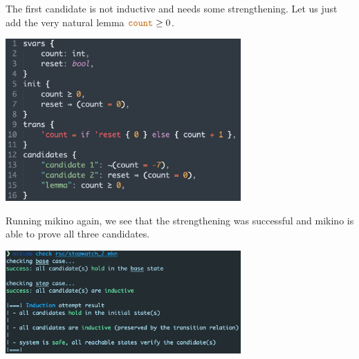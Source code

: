 \documentclass{easychair}
\newcommand{\mkn}{mikino}
\newcommand{\code}[1]{\textcolor{orange!75!black}{\texttt{#1}}}
\newcommand{\picwidth}{9cm}
\begin{document}
The first candidate is not inductive and needs some strengthening. Let us just add the very natural
lemma \(\code{count} \geq 0\).
%
\begin{center}
    \includegraphics[width=\picwidth]{../rsc/stopwatch_2.png}
\end{center}

Running \mkn{} again, we see that the strengthening was successful and \mkn{} is able to prove all
three candidates.

\begin{center}
    \includegraphics[width=\picwidth]{../rsc/stopwatch_run_2.png}
\end{center}
\end{document}
